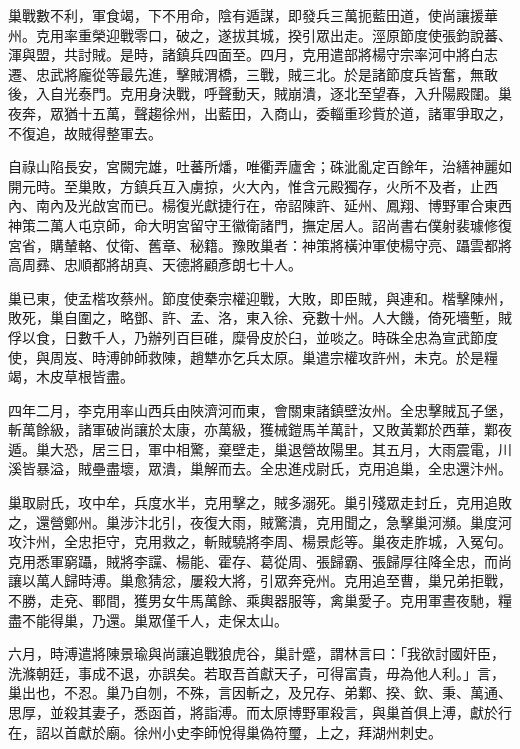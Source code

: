 \begin{pinyinscope}
 巢戰數不利，軍食竭，下不用命，陰有遁謀，即發兵三萬扼藍田道，使尚讓援華州。克用率重榮迎戰零口，破之，遂拔其城，揆引眾出走。涇原節度使張鈞說蕃、渾與盟，共討賊。是時，諸鎮兵四面至。四月，克用遣部將楊守宗率河中將白志遷、忠武將龐從等最先進，擊賊渭橋，三戰，賊三北。於是諸節度兵皆奮，無敢後，入自光泰門。克用身決戰，呼聲動天，賊崩潰，逐北至望春，入升陽殿闥。巢夜奔，眾猶十五萬，聲趨徐州，出藍田，入商山，委輜重珍貲於道，諸軍爭取之，不復追，故賊得整軍去。



 自祿山陷長安，宮闕完雄，吐蕃所燔，唯衢弄廬舍；硃泚亂定百餘年，治繕神麗如開元時。至巢敗，方鎮兵互入虜掠，火大內，惟含元殿獨存，火所不及者，止西內、南內及光啟宮而已。楊復光獻捷行在，帝詔陳許、延州、鳳翔、博野軍合東西神策二萬人屯京師，命大明宮留守王徽衛諸門，撫定居人。詔尚書右僕射裴璩修復宮省，購輦輅、仗衛、舊章、秘籍。豫敗巢者：神策將橫沖軍使楊守亮、躡雲都將高周彞、忠順都將胡真、天德將顧彥朗七十人。



 巢已東，使孟楷攻蔡州。節度使秦宗權迎戰，大敗，即臣賊，與連和。楷擊陳州，敗死，巢自圍之，略鄧、許、孟、洛，東入徐、兗數十州。人大饑，倚死墻塹，賊俘以食，日數千人，乃辦列百巨碓，糜骨皮於臼，並啖之。時硃全忠為宣武節度使，與周岌、時溥帥師救陳，趙犨亦乞兵太原。巢遣宗權攻許州，未克。於是糧竭，木皮草根皆盡。



 四年二月，李克用率山西兵由陜濟河而東，會關東諸鎮壁汝州。全忠擊賊瓦子堡，斬萬餘級，諸軍破尚讓於太康，亦萬級，獲械鎧馬羊萬計，又敗黃鄴於西華，鄴夜遁。巢大恐，居三日，軍中相驚，棄壁走，巢退營故陽里。其五月，大雨震電，川溪皆暴溢，賊壘盡壞，眾潰，巢解而去。全忠進戍尉氏，克用追巢，全忠還汴州。



 巢取尉氏，攻中牟，兵度水半，克用擊之，賊多溺死。巢引殘眾走封丘，克用追敗之，還營鄭州。巢涉汴北引，夜復大雨，賊驚潰，克用聞之，急擊巢河瀕。巢度河攻汴州，全忠拒守，克用救之，斬賊驍將李周、楊景彪等。巢夜走胙城，入冤句。克用悉軍窮躡，賊將李讜、楊能、霍存、葛從周、張歸霸、張歸厚往降全忠，而尚讓以萬人歸時溥。巢愈猜忿，屢殺大將，引眾奔兗州。克用追至曹，巢兄弟拒戰，不勝，走兗、鄆間，獲男女牛馬萬餘、乘輿器服等，禽巢愛子。克用軍晝夜馳，糧盡不能得巢，乃還。巢眾僅千人，走保太山。



 六月，時溥遣將陳景瑜與尚讓追戰狼虎谷，巢計蹙，謂林言曰：「我欲討國奸臣，洗滌朝廷，事成不退，亦誤矣。若取吾首獻天子，可得富貴，毋為他人利。」言，巢出也，不忍。巢乃自刎，不殊，言因斬之，及兄存、弟鄴、揆、欽、秉、萬通、思厚，並殺其妻子，悉函首，將詣溥。而太原博野軍殺言，與巢首俱上溥，獻於行在，詔以首獻於廟。徐州小史李師悅得巢偽符璽，上之，拜湖州刺史。




\end{pinyinscope}
